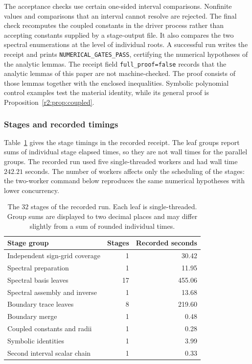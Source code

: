 The acceptance checks use certain one-sided interval comparisons. Nonfinite values and comparisons that an interval cannot resolve are rejected. The final check recomputes the coupled constants in the driver process rather than accepting constants supplied by a stage-output file. It also compares the two spectral enumerations at the level of individual roots. A successful run writes the receipt and prints \texttt{NUMERICAL\_GATES\_PASS}, certifying the numerical hypotheses of the analytic lemmas. The receipt field \texttt{full\_proof=false} records that the analytic lemmas of this paper are not machine-checked. The proof consists of those lemmas together with the enclosed inequalities. Symbolic polynomial control examples test the material identity, while its general proof is Proposition~\ref{r2:prop:coupled}.

\subsubsection{Stages and recorded timings}
Table~\ref{r2:tab:timings} gives the stage timings in the recorded receipt. The leaf groups report sums of individual stage elapsed times, so they are not wall times for the parallel groups. The recorded run used five single-threaded workers and had wall time $242.21$ seconds. The number of workers affects only the scheduling of the stages: the two-worker command below reproduces the same numerical hypotheses with lower concurrency.
\begin{table}[htbp]
\centering
\begin{tabular}{lrr}
\toprule
Stage group & Stages & Recorded seconds\\
\midrule
Independent sign-grid coverage & 1 & 30.42\\
Spectral preparation & 1 & 11.95\\
Spectral basis leaves & 17 & 455.06\\
Spectral assembly and inverse & 1 & 13.68\\
Boundary trace leaves & 8 & 219.60\\
Boundary merge & 1 & 0.48\\
Coupled constants and radii & 1 & 0.28\\
Symbolic identities & 1 & 3.99\\
Second interval scalar chain & 1 & 0.33\\
\bottomrule
\end{tabular}
\caption{The $32$ stages of the recorded run. Each leaf is single-threaded. Group sums are displayed to two decimal places and may differ slightly from a sum of rounded individual times.}\label{r2:tab:timings}
\end{table}

